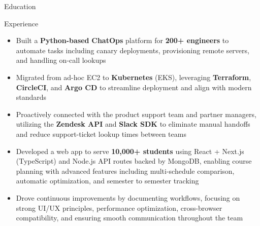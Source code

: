\documentclass{resume}
\begin{document}
\introduction[
    fullname={Declan Blanchard},
    email={declanblanc@gmail.com},
    linkedin={linkedin.com/in/declanblanc},
    github={github.com/declanblanc}
]

\begin{educationSection}{Education}
    \educationItem[
        university={New Jersey Institute of Technology},
        graduation={May 2026},
        grade={3.8 GPA},
        program={Bachelor's, Computer Science}
    ]
\end{educationSection}

\begin{experienceSection}{Experience}


    \experienceItem[
        company={Patreon},
        location={New York, NY},
        position={Software Engineer Intern},
        duration={May 2025 - August 2025}
    ]
    \begin{itemize}[itemsep=-6pt, leftmargin=2em, rightmargin=0.8em, before=\raggedright, after=\normalfont]
        \item Built a \textbf{Python-based} \textbf{ChatOps} platform for \textbf{200+ engineers} to automate tasks including canary deployments, provisioning remote servers, and handling on-call lookups
        \item Migrated from ad-hoc EC2 to \textbf{Kubernetes} (EKS), leveraging \textbf{Terraform}, \textbf{CircleCI}, and \textbf{Argo CD} to streamline deployment and align with modern standards
        \item Proactively connected with the product support team and partner managers, utilizing the \textbf{Zendesk API} and \textbf{Slack SDK} to eliminate manual handoffs and reduce support-ticket lookup times between teams 
    \end{itemize}

    \experienceItem[
        company={New Jersey Institute of Technology},
        location={Newark, NJ},
        position={Full Stack Developer},
        duration={January 2025 - Present}
    ]
    \begin{itemize}[itemsep=-6pt, leftmargin=2em, rightmargin=0.8em, before=\raggedright, after=\normalfont]
        \item Developed a web app to serve \textbf{10,000+ students} using React + Next.js (TypeScript) and Node.js API routes backed by MongoDB, enabling course planning with advanced features including multi-schedule comparison, automatic optimization, and semester to semester tracking
        \item Drove continuous improvements by documenting workflows, focusing on strong UI/UX principles, performance optimization, cross-browser compatibility, and ensuring smooth communication throughout the team
    \end{itemize}



\end{experienceSection}
\end{document}
